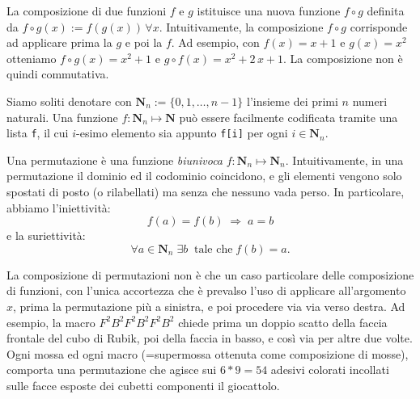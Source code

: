 \renewcommand{\nomebreve}{perm\_composition}
\renewcommand{\titolo}{Composizione di Permutazioni}

\introduzione{}

  La composizione di due funzioni $f$ e $g$ istituisce una nuova funzione $f\circ g$ definita da $f\circ g (x) := f(g(x)) \, \forall x$. Intuitivamente, la composizione $f\circ g$ corrisponde ad applicare prima la $g$ e poi la $f$.
  Ad esempio, con $f(x) = x+1$ e $g(x) = x^2$ otteniamo
  $f\circ g (x) = x^2+1$ e $g\circ f (x) = x^2+2\,x+1$. La composizione non è quindi commutativa.

Siamo soliti denotare con $\mathbf{N}_n := \{0,1, \ldots, n-1 \}$ l'insieme dei primi $n$ numeri naturali.
Una funzione $f:\mathbf{N}_n \mapsto \mathbf{N}$ può essere facilmente codificata tramite una lista {\tt f}, il cui $i$-esimo elemento sia appunto {\tt f[i]} per ogni $i\in \mathbf{N}_n$.

Una permutazione è una funzione \emph{biunivoca} $f:\mathbf{N}_n \mapsto \mathbf{N}_n$.
Intuitivamente, in una permutazione il dominio ed il codominio coincidono, e gli elementi vengono solo spostati di posto (o rilabellati) ma senza che nessuno vada perso.
In particolare, abbiamo l'iniettività:
\[
   f(a) = f(b) \; \Rightarrow \; a=b
\]
e la suriettività:
\[
   \forall a\in \mathbf{N}_n  \; \exists b  \; \; \mbox{tale che}  \;f(b) = a.
\]

    La composizione di permutazioni non è che un caso particolare delle composizione di funzioni, con l'unica accortezza che è prevalso l'uso di applicare all'argomento $x$, prima la permutazione più a sinistra, e poi procedere via via verso destra.
  Ad esempio, la macro $F^2B^2F^2B^2F^2B^2$ chiede prima un doppio scatto della faccia frontale del cubo di Rubik, poi della faccia in basso, e così via per altre due volte. Ogni mossa ed ogni macro (=supermossa ottenuta come composizione di mosse), comporta una permutazione che agisce sui $6*9=54$ adesivi colorati incollati sulle facce esposte dei cubetti componenti il giocattolo.\\ 

